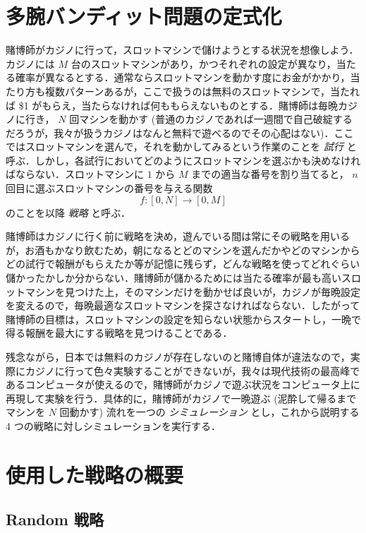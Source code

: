 \documentclass{jsarticle}
\begin{document}
\section{多腕バンディット問題の定式化}\label{sec:definitions}

賭博師がカジノに行って，スロットマシンで儲けようとする状況を想像しよう．カジノには $M$ 台のスロットマシンがあり，かつそれぞれの設定が異なり，当たる確率が異なるとする．通常ならスロットマシンを動かす度にお金がかかり，当たり方も複数パターンあるが，ここで扱うのは無料のスロットマシンで，当たれば \$1 がもらえ，当たらなければ何ももらえないものとする．賭博師は毎晩カジノに行き， $N$ 回マシンを動かす (普通のカジノであれば一週間で自己破綻するだろうが，我々が扱うカジノはなんと無料で遊べるのでその心配はない)．ここではスロットマシンを選んで，それを動かしてみるという作業のことを {\em 試行\/} と呼ぶ．しかし，各試行においてどのようにスロットマシンを選ぶかも決めなければならない．スロットマシンに $1$ から $M$ までの適当な番号を割り当てると， $n$ 回目に選ぶスロットマシンの番号を与える関数
\begin{equation}
  f : [0, N] \to [0, M]
\end{equation}
のことを以降 {\em 戦略\/} と呼ぶ．

賭博師はカジノに行く前に戦略を決め，遊んでいる間は常にその戦略を用いるが，お酒もかなり飲むため，朝になるとどのマシンを選んだかやどのマシンからどの試行で報酬がもらえたか等が記憶に残らず，どんな戦略を使ってどれぐらい儲かったかしか分からない．賭博師が儲かるためには当たる確率が最も高いスロットマシンを見つけた上，そのマシンだけを動かせば良いが，カジノが毎晩設定を変えるので，毎晩最適なスロットマシンを探さなければならない．したがって賭博師の目標は，スロットマシンの設定を知らない状態からスタートし，一晩で得る報酬を最大にする戦略を見つけることである．

残念ながら，日本では無料のカジノが存在しないのと賭博自体が違法なので，実際にカジノに行って色々実験することができないが，我々は現代技術の最高峰であるコンピュータが使えるので，賭博師がカジノで遊ぶ状況をコンピュータ上に再現して実験を行う．具体的に，賭博師がカジノで一晩遊ぶ (泥酔して帰るまでマシンを $N$ 回動かす) 流れを一つの {\em シミュレーション\/} とし，これから説明する 4 つの戦略に対しシミュレーションを実行する．

\section{使用した戦略の概要}\label{sec:strategy_overview}

\subsection{Random 戦略}
\end{document}
